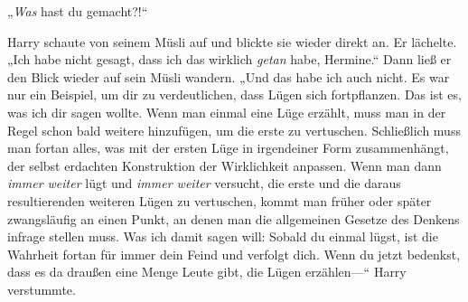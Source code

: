 „\emph{Was} hast du gemacht?!“

Harry schaute von seinem Müsli auf und blickte sie wieder direkt an. Er lächelte. „Ich habe nicht gesagt, dass ich das wirklich \emph{getan} habe, Hermine.“ Dann ließ er den Blick wieder auf sein Müsli wandern. „Und das habe ich auch nicht. Es war nur ein Beispiel, um dir zu verdeutlichen, dass Lügen sich fortpflanzen. Das ist es, was ich dir sagen wollte. Wenn man einmal eine Lüge erzählt, muss man in der Regel schon bald weitere hinzufügen, um die erste zu vertuschen. Schließlich muss man fortan alles, was mit der ersten Lüge in irgendeiner Form zusammenhängt, der selbst erdachten Konstruktion der Wirklichkeit anpassen. Wenn man dann \emph{immer weiter} lügt und \emph{immer weiter} versucht, die erste und die daraus resultierenden weiteren Lügen zu vertuschen, kommt man früher oder später zwangsläufig an einen Punkt, an denen man die allgemeinen Gesetze des Denkens infrage stellen muss. Was ich damit sagen will: Sobald du einmal lügst, ist die Wahrheit fortan für immer dein Feind und verfolgt dich. Wenn du jetzt bedenkst, dass es da draußen eine Menge Leute gibt, die Lügen erzählen—“ Harry verstummte.

